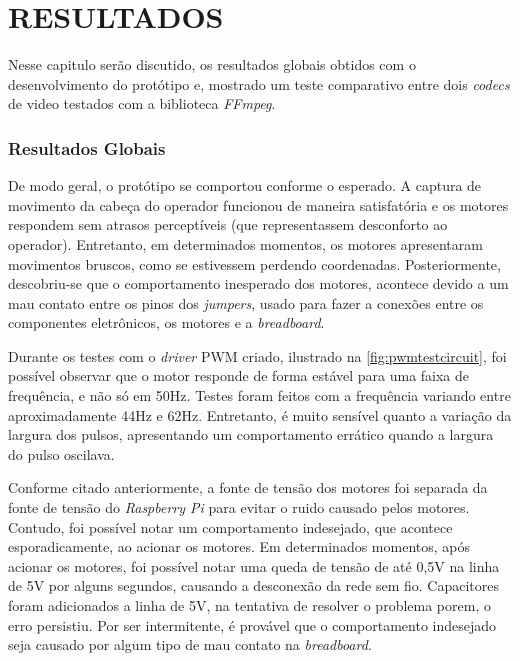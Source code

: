 
\chapter{RESULTADOS}
\label{chap:resultados}

Nesse capitulo serão discutido, os resultados globais obtidos com o desenvolvimento do protótipo e, mostrado um teste comparativo entre dois \textit{codecs} de video testados com a biblioteca \textit{FFmpeg}.\par

\subsection{Resultados Globais}
\label{subsec:resglobais}

De modo geral, o protótipo se comportou conforme o esperado. A captura de movimento da cabeça do operador funcionou de maneira satisfatória e os motores respondem sem atrasos perceptíveis (que representassem desconforto ao operador). Entretanto, em determinados momentos, os motores apresentaram movimentos bruscos, como se estivessem perdendo coordenadas. Posteriormente, descobriu-se que o comportamento inesperado dos motores, acontece devido a um mau contato entre os pinos dos \textit{jumpers}, usado para fazer a conexões entre os componentes eletrônicos, os motores e a \textit{breadboard}. \par

Durante os testes com o \textit{driver} PWM criado, ilustrado na \autoref{fig:pwmtestcircuit}, foi possível observar que o motor responde de forma estável para uma faixa de frequência, e não só em 50Hz. Testes foram feitos com a frequência variando entre aproximadamente 44Hz e 62Hz. Entretanto, é muito sensível quanto a variação da largura dos pulsos, apresentando um comportamento errático quando a largura do pulso oscilava.\par

Conforme citado anteriormente, a fonte de tensão dos motores foi separada da fonte de tensão do \textit{Raspberry Pi} para evitar o ruido causado pelos motores. Contudo, foi possível notar um comportamento indesejado, que acontece esporadicamente, ao acionar os motores. Em determinados momentos, após acionar os motores, foi possível notar uma queda de tensão de até 0,5V na linha de 5V por alguns segundos, causando a desconexão da rede sem fio. Capacitores foram adicionados a linha de 5V, na tentativa de resolver o problema porem, o erro persistiu. Por ser intermitente, é provável que o comportamento indesejado seja causado por algum tipo de mau contato na \textit{breadboard}. \par

